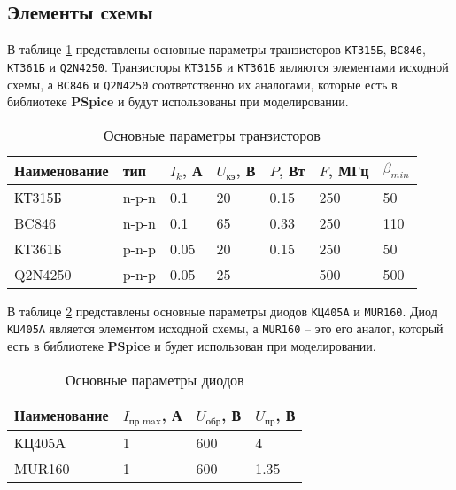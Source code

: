 \subsection{Элементы схемы}

В таблице \ref{tab:transistors} представлены основные параметры транзисторов \verb+КТ315Б+, \verb+BC846+, \verb+КТ361Б+ и \verb+Q2N4250+. Транзисторы \verb+КТ315Б+ и \verb+КТ361Б+ являются элементами исходной схемы, а \verb+BC846+ и \verb+Q2N4250+ соответственно их аналогами, которые есть в библиотеке \textbf{PSpice} и будут использованы при моделировании.

\begin{table}[H]
\begin{center}
	\caption{Основные параметры транзисторов}
	\label{tab:transistors}
	\def\tabcolsep{10pt}
	\begin{tabular}{|l|l|l|l|l|l|l|}
		\hline
		Наименование &
		тип & 
		$I_k$, А &
		$U_\text{кэ}$, В & 
		$P$, Вт & 
		$F$, МГц & 
		$\beta_{min}$ \\ 
		\hline
		КТ315Б &
		n-p-n &
		0.1 &
		20 &
		0.15 &
		250 &
		50 \\
		\hline
		BC846 &
		n-p-n &
		0.1 &
		65 &
		0.33 &
		250 &
		110 \\
		\hline
		КТ361Б &
		p-n-p &
		0.05 &
		20 &
		0.15 &
		250 &
		50 \\
		\hline
		Q2N4250 &
		p-n-p  &
		0.05 &
		25 &
		&
		500 &
		500 \\ 
		\hline
\end{tabular}
\end{center}
\end{table}

В таблице \ref{tab:diods} представлены основные параметры диодов \verb+КЦ405А+ и \verb+MUR160+. Диод \verb+КЦ405А+ является элементом исходной схемы, а \verb+MUR160+ -- это его аналог, который есть в библиотеке \textbf{PSpice} и будет использован при моделировании.

\begin{table}[H]
\begin{center}
	\caption{Основные параметры диодов}
	\label{tab:diods}
	\def\tabcolsep{10pt}
	\begin{tabular}{|l|l|l|l|}
		\hline
		Наименование &
		$I_\text{пр max}$, А &
		$U_\text{обр}$, В &
		$U_\text{пр}$, В \\ 
		\hline
		КЦ405А &
		1 &
		600 &
		4 \\
		\hline
		MUR160 &
		1 &
		600 &
		1.35 \\
		\hline
\end{tabular}
\end{center}
\end{table}

